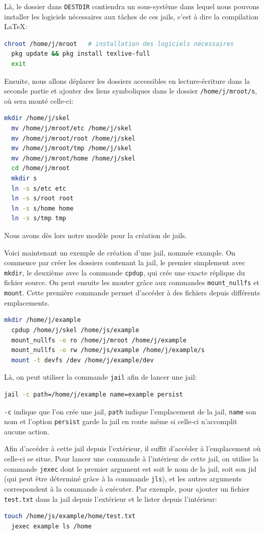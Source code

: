 \documentclass[10pt,a4paper]{article}
\begin{document}
Là, le dossier dans \texttt{DESTDIR} contiendra un sous-système dans lequel nous pouvons installer les logiciels nécessaires aux tâches de ces jails, c'est à dire la compilation \LaTeX:
\begin{lstlisting}[language=bash]
  chroot /home/j/mroot   # installation des logiciels nécessaires
  pkg update && pkg install texlive-full
  exit
\end{lstlisting}

Ensuite, nous allons déplacer les dossiers accessibles en lecture-écriture dans la seconde partie et ajouter des liens symboliques dans le dossier \texttt{/home/j/mroot/s}, où sera monté celle-ci:
\begin{lstlisting}[language=bash]
  mkdir /home/j/skel
  mv /home/j/mroot/etc /home/j/skel
  mv /home/j/mroot/root /home/j/skel
  mv /home/j/mroot/tmp /home/j/skel
  mv /home/j/mroot/home /home/j/skel
  cd /home/j/mroot
  mkdir s
  ln -s s/etc etc
  ln -s s/root root
  ln -s s/home home
  ln -s s/tmp tmp
\end{lstlisting}
Nous avons dès lors notre modèle pour la création de jails.

Voici maintenant un exemple de création d'une jail, nommée example.
On commence par créer les dossiers contenant la jail, le premier simplement avec \texttt{mkdir},
le deuxième avec la commande \texttt{cpdup}, qui crée une exacte réplique du fichier source.
On peut ensuite les monter grâce aux commandes \texttt{mount\_nullfs} et \texttt{mount}.
Cette première commande permet d'accéder à des fichiers depuis différents emplacements.

\begin{lstlisting}[language=bash]
  mkdir /home/j/example
  cpdup /home/j/skel /home/js/example
  mount_nullfs -o ro /home/j/mroot /home/j/example
  mount_nullfs -o rw /home/js/example /home/j/example/s
  mount -t devfs /dev /home/j/example/dev
\end{lstlisting}
Là, on peut utiliser la commande \texttt{jail} afin de lancer une jail:
\begin{lstlisting}[language=bash]
  jail -c path=/home/j/example name=example persist
\end{lstlisting}
\texttt{-c} indique que l'on crée une jail, \texttt{path} indique l'emplacement de la jail,
\texttt{name} son nom et l'option \texttt{persist} garde la jail en route même si celle-ci n'accomplit aucune action.

Afin d'accéder à cette jail depuis l'extérieur, il suffit d'accéder à l'emplacement où celle-ci se situe.
Pour lancer une commande à l'intérieur de cette jail,
on utilise la commande \texttt{jexec} dont le premier argument est soit le nom de la jail,
soit son jid (qui peut être déterminé grâce à la commande \texttt{jls}),
et les autres arguments correspondent à la commande à exécuter.
Par exemple, pour ajouter un fichier \texttt{test.txt} dans la jail depuis l'extérieur et le lister depuis l'intérieur:
\begin{lstlisting}[language=bash]
  touch /home/js/example/home/test.txt
  jexec example ls /home
\end{lstlisting}
\end{document}
